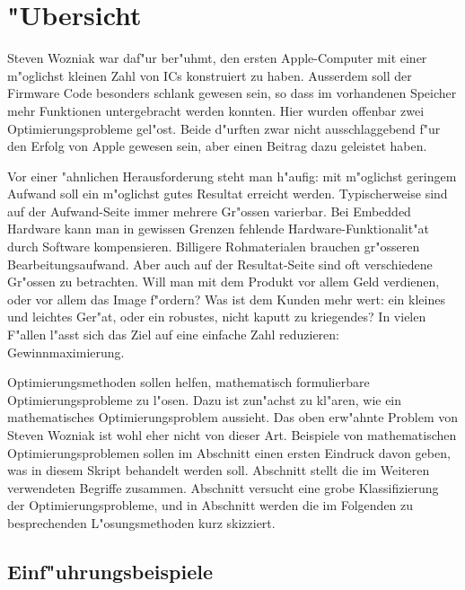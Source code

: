 \chapter{"Ubersicht}
\rhead{}
Steven Wozniak war daf"ur ber"uhmt, den ersten Apple-Computer mit
einer m"oglichst kleinen Zahl von ICs konstruiert zu haben.
Ausserdem soll der Firmware Code besonders schlank gewesen sein, so
dass im vorhandenen Speicher mehr Funktionen untergebracht werden 
konnten. Hier wurden offenbar zwei Optimierungsprobleme gel"ost.
Beide d"urften zwar nicht ausschlaggebend f"ur den Erfolg von
Apple gewesen sein, aber einen Beitrag dazu geleistet haben.

Vor einer "ahnlichen Herausforderung steht man h"aufig: mit m"oglichst
geringem Aufwand soll ein m"oglichst gutes Resultat erreicht werden.
Typischerweise sind auf der Aufwand-Seite immer mehrere Gr"ossen varierbar.
Bei Embedded Hardware kann man in gewissen Grenzen
fehlende Hardware-Funktionalit"at durch Software kompensieren.
Billigere Rohmaterialen brauchen gr"osseren Bearbeitungsaufwand.
Aber auch auf der Resultat-Seite sind oft verschiedene Gr"ossen zu
betrachten.
Will man mit dem Produkt vor allem Geld verdienen, oder vor allem
das Image f"ordern?
Was ist dem Kunden mehr wert: ein kleines und leichtes
Ger"at, oder ein robustes, nicht kaputt zu kriegendes? 
In vielen F"allen l"asst sich das Ziel auf eine einfache
Zahl reduzieren: Gewinnmaximierung.

Optimierungsmethoden sollen helfen, mathematisch formulierbare
Optimierungsprobleme zu l"osen. Dazu ist zun"achst zu kl"aren,
wie ein mathematisches Optimierungsproblem aussieht.
Das oben erw"ahnte Problem von Steven Wozniak ist wohl eher nicht
von dieser Art. Beispiele von mathematischen Optimierungsproblemen
sollen im Abschnitt \label{section-einfuehrungsbeispiele} einen
ersten Eindruck davon geben, was in diesem Skript behandelt werden soll.
Abschnitt \label{section-begriffe} stellt die im Weiteren verwendeten
Begriffe zusammen. Abschnitt \label{section-klassifizierung} versucht
eine grobe Klassifizierung der Optimierungsprobleme, und in Abschnitt
\label{section-loesungsuebersicht} werden die im Folgenden zu
besprechenden L"osungsmethoden kurz skizziert.

\section{Einf"uhrungsbeispiele\label{section-einfuehrungsbeispiele}}

